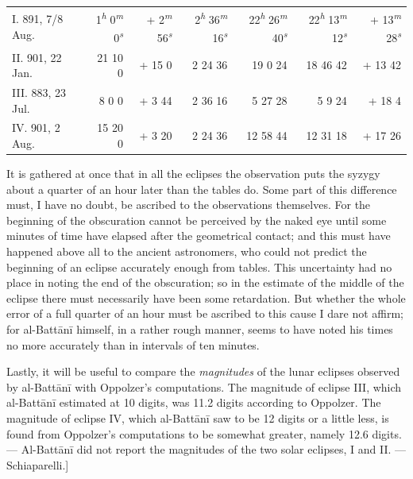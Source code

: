 \documentclass[11pt]{article}
\newcommand{\Pg}[1]{\marginpar{\footnotesize\color{gray}#1}}
\begin{document}
\begin{center}
\begin{tabular}{@{}lrrrrrr@{}}
\midrule
I. 891, 7/8 Aug. & 1\textsuperscript{\itshape h} 0\textsuperscript{\itshape m} 0\textsuperscript{\itshape s} & + 2\textsuperscript{\itshape m} 56\textsuperscript{\itshape s} & 2\textsuperscript{\itshape h} 36\textsuperscript{\itshape m} 16\textsuperscript{\itshape s} & 22\textsuperscript{\itshape h} 26\textsuperscript{\itshape m} 40\textsuperscript{\itshape s} & 22\textsuperscript{\itshape h} 13\textsuperscript{\itshape m} 12\textsuperscript{\itshape s} & + 13\textsuperscript{\itshape m} 28\textsuperscript{\itshape s} \\
II. 901, 22 Jan. & 21 10 0 & + 15 0 & 2 24 36 & 19 0 24 & 18 46 42 & + 13 42 \\
III. 883, 23 Jul. & 8 0 0 & + 3 44 & 2 36 16 & 5 27 28 & 5 9 24 & + 18 4 \\
IV. 901, 2 Aug. & 15 20 0 & + 3 20 & 2 24 36 & 12 58 44 & 12 31 18 & + 17 26\footnotemarkT{} \\
\end{tabular}\end{center}
\addtocounter{footnoteT}{-1}
\par \Pg{I 234}It is gathered at once that in all the eclipses the observation puts the syzygy about a quarter of an hour later than the tables do. Some part of this difference must, I have no doubt, be ascribed to the observations themselves. For the beginning of the obscuration cannot be perceived by the naked eye until some minutes of time have elapsed after the geometrical contact; and this must have happened above all to the ancient astronomers, who could not predict the beginning of an eclipse accurately enough from tables. This uncertainty had no place in noting the end of the obscuration; so in the estimate of the middle of the eclipse there must necessarily have been some retardation. But whether the whole error of a full quarter of an hour must be ascribed to this cause I dare not affirm; for al-Battānī himself, in a rather rough manner, seems to have noted his times no more accurately than in intervals of ten minutes.\par
\par Lastly, it will be useful to compare the \emph{magnitudes} of the lunar eclipses observed by al-Battānī with Oppolzer's computations. The magnitude of eclipse III, which al-Battānī estimated at 10 digits, was 11.2 digits according to Oppolzer. The magnitude of eclipse IV, which al-Battānī saw to be 12 digits or a little less, is found from Oppolzer's computations to be somewhat greater, namely 12.6 digits. — Al-Battānī did not report the magnitudes of the two solar eclipses, I and II. — Schiaparelli.]\par
\end{document}
